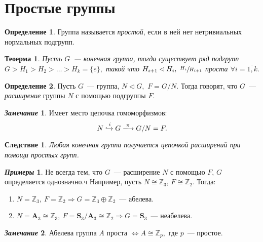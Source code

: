 \documentclass[a4paper, 14pt]{extarticle}
\newcommand{\integers}{\mathbb{Z}}
\newcommand{\symmetrical}{\mathbf{S}}
\newcommand{\alternating}{\mathbf{A}}
\theoremstyle{definition}
\newtheorem*{exmpls}{\textit{Примеры}}
\newtheorem*{remark}{\textit{Замечание}}
\newtheorem{definition}{Определение}
\theoremstyle{plain}
\newtheorem{theorem}{Теоерма}
\numberwithin{theorem}{section}
\numberwithin{definition}{section}
\numberwithin{statement}{section}
\numberwithin{lemma}{section}
\newtheorem*{consequence*}{Следствие}
\numberwithin{consequence}{section}
\begin{document}
        \section{Простые группы}
        \setcounter{definition}{0}
        \begin{definition}
            Группа называется \textit{простой}, если в ней нет нетривиальных нормальных подгрупп.
        \end{definition}
        \begin{theorem}
            Пусть $G$~--- конечная группа, тогда существует ряд подгрупп ${G > H_1 > H_2 > \ldots > H_k = \{e\},}$ такой что ${H_{i + 1} \lhd H_i, \ \sfrac{H_i}{H_{i+1}}}$ проста ${\forall i = \overline{1,k}.}$
        \end{theorem}
        \begin{definition}
            Пусть $G$~--- группа, ${N \lhd G,}$ ${F = G/N.}$ Тогда говорят, что $G$~--- \textit{расширение} группы $N$ с помощью подгруппы $F$.
        \end{definition}
        \begin{remark}
            Имеет место цепочка гомоморфизмов:
            \begin{equation*}
                N \xhookrightarrow{i} G \xlongrightarrow{\pi} G/N = F.
            \end{equation*}
        \end{remark}
        \begin{consequence*}
            Любая конечная группа получается цепочкой расширений при помощи простых групп.
        \end{consequence*}
        \begin{exmpls}
            Не всегда тем, что $G$~--- расширение $N$ с помощью $F$, $G$ определяется однозначно.ч Например, пусть ${N \cong \integers_3}$, ${F \cong \integers_2}$. Тогда: 
            \begin{enumerate}
            \setlength\itemsep{0.1em}
                \item ${N = \integers_3, \ F = \integers_2 \Rightarrow G = \integers_3 \oplus \integers_2}$~--- абелева.
                \item ${N = \alternating_3 \cong \integers_3, \ F = \symmetrical_3/\alternating_3 \cong \integers_2 \Rightarrow G = \symmetrical_3}$~--- неабелева.
            \end{enumerate}
        \end{exmpls}
        \begin{remark}
            Абелева группа $A$ проста ${\Leftrightarrow A \cong \integers_p,}$ где $p$~--- простое.
        \end{remark}
\end{document}
